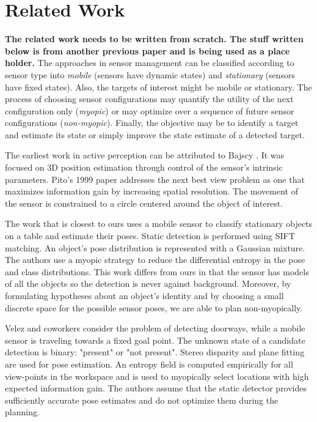 \section{Related Work}
\label{sec:rel_work}
{\bf The related work needs to be written from scratch. The stuff written below is from another previous paper and is being used as a place holder.} The approaches in sensor management \cite{Hero11_sensor_management, Huber09_PhD} can be classified according to sensor type into \textit{mobile} (sensors have dynamic states) and \textit{stationary} (sensors have fixed states). Also, the targets of interest might be mobile or stationary. The process of choosing sensor configurations may quantify the utility of the next configuration only (\textit{myopic}) or may optimize over a sequence of future sensor configurations (\textit{non-myopic}). Finally, the objective may be to identify a target and estimate its state or simply improve the state estimate of a detected target.

The earliest work in active perception can be attributed to Bajscy \cite{bajscy_88, Krotkov_93}. It was focused on 3D position estimation through control of the sensor's intrinsic parameters. Pito's 1999 paper \cite{pito99_nbv} addresses the next best view problem as one that maximizes information gain by increasing spatial resolution. The movement of the sensor is constrained to a circle centered around the object of interest.

The work that is closest to ours \cite{Scharinger10_SceneModeling6D} uses a mobile sensor to classify stationary objects on a table and estimate their poses. Static detection is performed using SIFT matching. An object's pose distribution is represented with a Gaussian mixture. The authors use a myopic strategy to reduce the differential entropy in the pose and class distributions. This work differs from ours in that the sensor has models of all the objects so the detection is never against background. Moreover, by formulating hypotheses about an object's identity and by choosing a small discrete space for the possible sensor poses, we are able to plan non-myopically.

Velez and coworkers \cite{velez11_ijcai, velez11_icaps} consider the problem of detecting doorways, while a mobile sensor is traveling towards a fixed goal point. The unknown state of a candidate detection is binary: "present" or "not present". Stereo disparity and plane fitting are used for pose estimation. An entropy field is computed empirically for all view-points in the workspace and is used to myopically select locations with high expected information gain. The authors assume that the static detector provides sufficiently accurate pose estimates and do not optimize them during the planning.

